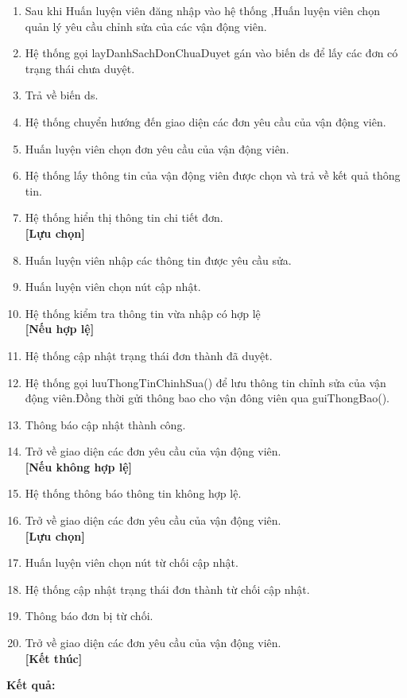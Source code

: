 \noindent
\begin{enumerate}
  \item  Sau khi Huấn luyện viên đăng nhập vào hệ thống ,Huấn luyện viên chọn quản lý yêu cầu chỉnh sửa của các vận động viên.
  \item Hệ thống gọi layDanhSachDonChuaDuyet gán vào biến ds để lấy các đơn có trạng thái chưa duyệt.
  \item Trả về biến ds.
  \item Hệ thống chuyển hướng đến giao diện các đơn yêu cầu của vận động viên.
  \item Huấn luyện viên chọn đơn yêu cầu của vận động viên.
  \item Hệ thống lấy thông tin của vận động viên được chọn và trả về kết quả thông tin.
  \item Hệ thống hiển thị thông tin chi tiết đơn.
        \\\textbf{[Lựu chọn]}
  \item Huấn luyện viên nhập các thông tin được yêu cầu sửa.
  \item Huấn luyện viên chọn nút cập nhật.
  \item Hệ thống kiểm tra thông tin vừa nhập có hợp lệ
        \\\textbf{[Nếu hợp lệ]}
  \item Hệ thống cập nhật trạng thái đơn thành đã duyệt.
  \item Hệ thống gọi luuThongTinChinhSua() để lưu thông tin chỉnh sửa của vận động viên.Đồng thời gửi thông bao cho vận đông viên qua guiThongBao().
  \item Thông báo cập nhật thành công.
  \item Trở về giao diện các đơn yêu cầu của vận động viên.
        \\\textbf{[Nếu không hợp lệ]}
  \item Hệ thống thông báo thông tin không hợp lệ.
  \item Trở về giao diện các đơn yêu cầu của vận động viên.
        \\\textbf{[Lựu chọn]}
  \item Huấn luyện viên chọn nút từ chối cập nhật.
  \item Hệ thống cập nhật trạng thái đơn thành từ chối cập nhật.
  \item Thông báo đơn bị từ chối.
  \item Trở về giao diện các đơn yêu cầu của vận động viên.
        \\\textbf{[Kết thúc]}
\end{enumerate}

\noindent
\textbf{Kết quả:}

